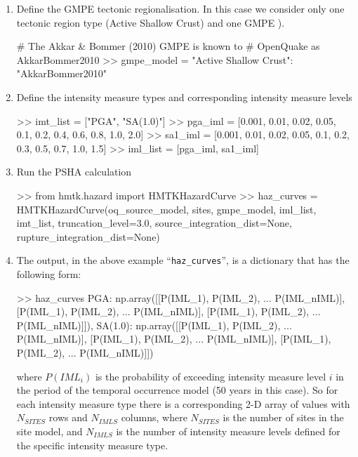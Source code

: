 \begin{enumerate}
\item Define the GMPE tectonic regionalisation. In this case we consider only one tectonic region type (Active Shallow Crust) and one GMPE \parencite{akkar2010}). 

\begin{python}[frame=single]
# The Akkar & Bommer (2010) GMPE is known to 
# OpenQuake as AkkarBommer2010
>> gmpe_model = {"Active Shallow Crust": "AkkarBommer2010"}
\end{python}

\item Define the intensity measure types and corresponding intensity measure levels

\begin{python}[frame=single]
>> imt_list = ["PGA", "SA(1.0)"]
>> pga_iml = [0.001, 0.01, 0.02, 0.05, 0.1, 
                    0.2, 0.4, 0.6, 0.8, 1.0, 2.0]
>> sa1_iml = [0.001, 0.01, 0.02, 0.05, 0.1,
                    0.2, 0.3, 0.5, 0.7, 1.0, 1.5]
>> iml_list = [pga_iml, sa1_iml]
\end{python}

\item Run the PSHA calculation

\begin{python}[frame=single]
>> from hmtk.hazard import HMTKHazardCurve
>> haz_curves = HMTKHazardCurve(oq_source_model,
                                sites,
                                gmpe_model,
                                iml_list,
                                imt_list,
                                truncation_level=3.0,
                                source_integration_dist=None,
                                rupture_integration_dist=None)
\end{python}

\item The output, in the above example ``\verb=haz_curves='', is a dictionary that has the following form:

\begin{python}[frame=single]

>> haz_curves
{PGA: np.array([[P(IML_1), P(IML_2), ... P(IML_nIML)],
                [P(IML_1), P(IML_2), ... P(IML_nIML)],
                [P(IML_1), P(IML_2), ... P(IML_nIML)]]),
SA(1.0): np.array([[P(IML_1), P(IML_2), ... P(IML_nIML)],
                   [P(IML_1), P(IML_2), ... P(IML_nIML)],
                   [P(IML_1), P(IML_2), ... P(IML_nIML)]])}
\end{python}

where $P(IML_i)$ is the probability of exceeding intensity measure level $i$ in the period of the temporal occurrence model (50 years in this case). So for each intensity measure type there is a corresponding 2-D array of values with $N_{SITES}$ rows and $N_{IMLS}$ columns, where $N_{SITES}$ is the number of sites in the site model, and $N_{IMLS}$ is the number of intensity measure levels defined for the specific intensity measure type.

\end{enumerate}

